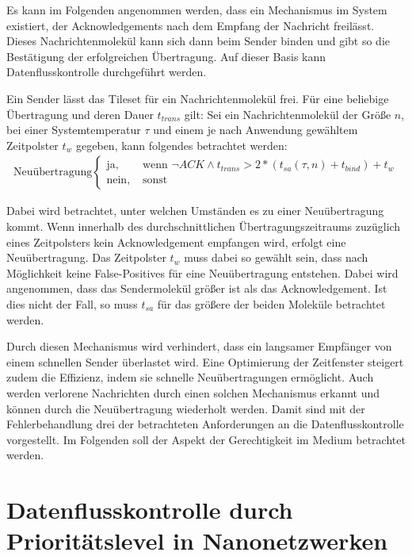 Es kann im Folgenden angenommen werden, dass ein Mechanismus im System existiert, der Acknowledgements nach dem Empfang der Nachricht freilässt. Dieses Nachrichtenmolekül kann sich dann beim Sender binden und gibt so die Bestätigung der erfolgreichen Übertragung. Auf dieser Basis kann Datenflusskontrolle durchgeführt werden.

Ein Sender lässt das Tileset für ein Nachrichtenmolekül frei. Für eine beliebige Übertragung und deren Dauer $t_{trans}$ gilt: Sei ein Nachrichtenmolekül der Größe $n$, bei einer Systemtemperatur $\tau$ und einem je nach Anwendung gewähltem Zeitpolster $t_w$ gegeben, kann folgendes betrachtet werden:
\begin{align*}
    \text{Neuübertragung}
    \begin{cases}
        \text{ja, } &\text{wenn } \lnot ACK \land t_{trans} > 2*(t_{sa}(\tau,n) + t_{bind}) + t_w\\
        \text{nein, } &\text{sonst }
    \end{cases}
\end{align*}

Dabei wird betrachtet, unter welchen Umständen es zu einer Neuübertragung kommt. Wenn innerhalb des durchschnittlichen Übertragungszeitraums zuzüglich eines Zeitpolsters kein Acknowledgement empfangen wird, erfolgt eine Neuübertragung.
Das Zeitpolster $t_w$ muss dabei so gewählt sein, dass nach Möglichkeit keine False-Positives für eine Neuübertragung entstehen. 
Dabei wird angenommen, dass das Sendermolekül größer ist als das Acknowledgement. Ist dies nicht der Fall, so muss $t_{sa}$ für das größere der beiden Moleküle betrachtet werden.

Durch diesen Mechanismus wird verhindert, dass ein langsamer Empfänger von einem schnellen Sender überlastet wird. Eine Optimierung der Zeitfenster steigert zudem die Effizienz, indem sie schnelle Neuübertragungen ermöglicht. Auch werden verlorene Nachrichten durch einen solchen Mechanismus erkannt und können durch die Neuübertragung wiederholt werden. Damit sind mit der Fehlerbehandlung drei der betrachteten Anforderungen an die Datenflusskontrolle vorgestellt. Im Folgenden soll der Aspekt der Gerechtigkeit im Medium betrachtet werden.

\section{Datenflusskontrolle durch Prioritätslevel in Nanonetzwerken}

